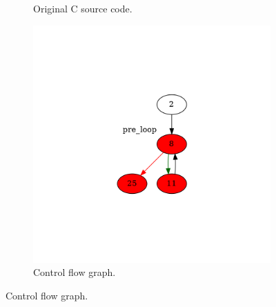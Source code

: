 \begin{figure}[htbp]
	\centering
	\begin{subfigure}[b]{0.48\textwidth}
		\centering
		
		\caption{Original C source code.}
	\end{subfigure}
	\begin{subfigure}[b]{0.50\textwidth}
		\centering
		\includegraphics[width=\textwidth]{inc/appendices/examples/hammock/example/without-break/main_0003a.png}
		\caption{Control flow graph.}
	\end{subfigure}
\end{figure}

